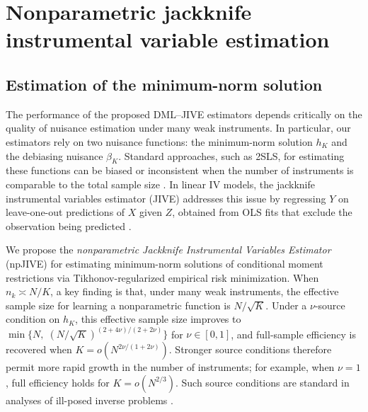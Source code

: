 \documentclass[11pt]{article}
\theoremstyle{plain}
\theoremstyle{definition}
\theoremstyle{remark}
\theoremstyle{definition}
\begin{document}
 

\section{Nonparametric jackknife instrumental variable estimation}

\label{sec::nuisance}
 
 
 


 
 

\subsection{Estimation of the minimum-norm solution}
\label{sec::nuisance1}

The performance of the proposed DML--JIVE estimators depends critically on the
quality of nuisance estimation under many weak instruments. In particular, our
estimators rely on two nuisance functions: the minimum-norm solution $h_K$ and
the debiasing nuisance $\beta_K$. Standard approaches, such as 2SLS, for
estimating these functions can be biased or inconsistent when the number of
instruments is comparable to the total sample size
\citep{angrist1999jackknife, chao2012asymptotic, peysakhovich2018learning}. In
linear IV models, the jackknife instrumental variables estimator (JIVE)
addresses this issue by regressing $Y$ on leave-one-out predictions of $X$ given
$Z$, obtained from OLS fits that exclude the observation being predicted
\citep{angrist1999jackknife}.  


We propose the \emph{nonparametric Jackknife Instrumental Variables Estimator}
(npJIVE) for estimating minimum-norm solutions of conditional moment
restrictions via Tikhonov-regularized empirical risk minimization. When
$n_k \asymp N/K$, a key finding is that, under many weak instruments, the
effective sample size for learning a nonparametric function is $N/\sqrt{K}$.
Under a $\nu$-source condition on $h_K$, this effective sample size improves to
$\min\!\{ N,\; (N/\sqrt{K})^{(2 + 4\nu)/(2 + 2\nu)} \}$ for $\nu \in [0,1]$, and
full-sample efficiency is recovered when
$K = o\!\left(N^{2\nu/(1 + 2\nu)}\right)$. Stronger source conditions therefore
permit more rapid growth in the number of instruments; for example, when
$\nu = 1$, full efficiency holds for $K = o(N^{2/3})$. Such source conditions
are standard in analyses of ill-posed inverse problems
\citep{carrasco2007linear}.
\end{document}
